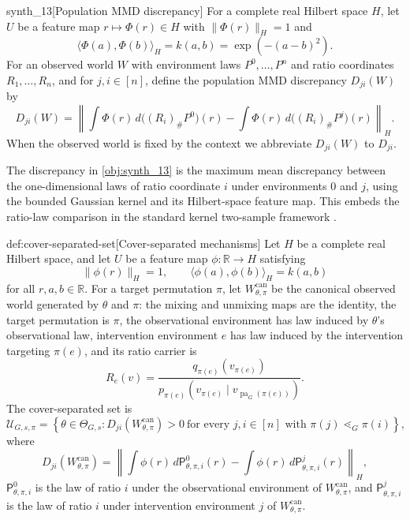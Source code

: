 \documentclass[11pt]{article}
\begin{document}
\begin{definitionv}{synth_13}[Population MMD discrepancy]
For a complete real Hilbert space \(H\), let \(U\) be a feature map \(r\mapsto \Phi(r)\in H\) with \(\|\Phi(r)\|_H=1\) and
\[
\langle \Phi(a),\Phi(b)\rangle_H=k(a,b)=\exp(-(a-b)^2).
\]
For an observed world \(W\) with environment laws \(P^0,\ldots,P^n\) and ratio coordinates \(R_1,\ldots,R_n\), and for \(j,i\in[n]\), define the population MMD discrepancy \(D_{ji}(W)\) by
\[
D_{ji}(W)
=
\left\|
\int \Phi(r)\,d\bigl((R_i)_\# P^0\bigr)(r)
-
\int \Phi(r)\,d\bigl((R_i)_\# P^j\bigr)(r)
\right\|_H .
\]
When the observed world is fixed by the context we abbreviate \(D_{ji}(W)\) to \(D_{ji}\).
\end{definitionv}

The discrepancy  in \cref{obj:synth_13} is the maximum mean discrepancy between the one-dimensional laws of ratio coordinate \(i\) under environments \(0\) and \(j\), using the bounded Gaussian kernel and its Hilbert-space feature map. This embeds the ratio-law comparison in the standard kernel two-sample framework \citep{GrettonEtAl2012KernelTwoSample,Sriperumbudur2010,Sriperumbudur2011}.

\begin{definitionv}{def:cover-separated-set}[Cover-separated mechanisms]
Let \(H\) be a complete real Hilbert space, and let \(U\) be a feature map \(\phi:\mathbb R\to H\) satisfying
\[
\|\phi(r)\|_H=1,
\qquad
\langle \phi(a),\phi(b)\rangle_H=k(a,b)
\]
for all \(r,a,b\in\mathbb R\).  For a target permutation \(\pi\), let \(W_{\theta,\pi}^{\mathrm{can}}\) be the canonical observed world generated by \(\theta\) and \(\pi\): the mixing and unmixing maps are the identity, the target permutation is \(\pi\), the observational environment has law induced by \(\theta\)'s observational law, intervention environment \(e\) has law induced by the intervention targeting \(\pi(e)\), and its ratio carrier is
\[
R_e(v)=
\frac{q_{\pi(e)}(v_{\pi(e)})}
{p_{\pi(e)}(v_{\pi(e)}\mid v_{\operatorname{pa}_G(\pi(e))})}.
\]
The cover-separated set is
\[
\mathcal U_{G,s,\pi}
=
\left\{
\theta\in\Theta_{G,s}:
D_{ji}\!\left(W_{\theta,\pi}^{\mathrm{can}}\right)>0
\ \text{for every } j,i\in[n]\text{ with }\pi(j)\lessdot_G\pi(i)
\right\},
\]
where
\[
D_{ji}\!\left(W_{\theta,\pi}^{\mathrm{can}}\right)
=
\left\|
\int \phi(r)\,d\mathsf P^0_{\theta,\pi,i}(r)
-
\int \phi(r)\,d\mathsf P^j_{\theta,\pi,i}(r)
\right\|_H,
\]
\(\mathsf P^0_{\theta,\pi,i}\) is the law of ratio \(i\) under the observational environment of \(W_{\theta,\pi}^{\mathrm{can}}\), and \(\mathsf P^j_{\theta,\pi,i}\) is the law of ratio \(i\) under intervention environment \(j\) of \(W_{\theta,\pi}^{\mathrm{can}}\).
\end{definitionv}
\end{document}
